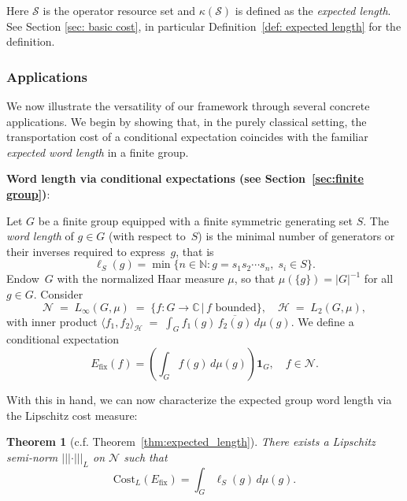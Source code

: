 \documentclass[11pt,reqno]{amsart}
\numberwithin{equation}{section}
\newtheorem{theorem}[lemma]{Theorem}
\newcommand{\mb}{\mathbb}
\newcommand{\mc}{\mathcal}
\newcommand{\Cost}{\mathrm{Cost}}
\newcommand{\fix}{\mathrm{fix}}
\begin{document}
Here $\mc S$ is the operator resource set and $\kappa(\mc S)$ is defined as the \textit{expected length}. See Section \ref{sec: basic cost}, in particular Definition~\ref{def: expected length} for the definition. 
\subsubsection{Applications}
We now illustrate the versatility of our framework through several concrete applications.  We begin by showing that, in the purely classical setting, the transportation cost of a conditional expectation coincides with the familiar \emph{expected word length} in a finite group.
\medskip 

\noindent \textbf{Word length via conditional expectations (see Section~\ref{sec:finite group})}: 

Let $G$ be a finite group equipped with a finite symmetric generating set $S$. The \emph{word length} of $g\in G$ (with respect to~$S$) is the minimal number of generators or their inverses required to express~$g$, that is
\begin{equation}
    \ell_{S}(g) = \min \{ n \in \mathbb{N} : g = s_1 s_2 \cdots s_n, \; s_i \in S \}.
\end{equation}
Endow~$G$ with the normalized Haar measure $\mu$, so that $\mu(\{g\})=|G|^{-1}$ for all $g\in G$. Consider
\[
  \mathcal N \;=\; L_{\infty}(G,\mu)
  \;=\;\bigl\{f:G\to\mb C \,\big|\, f\text{ bounded}\bigr\},
  \quad
  \mathcal H \;=\; L_{2}(G,\mu),
\]
with inner product $ \langle f_{1},f_{2}\rangle_{\mathcal H}
  \;=\;
  \int_G f_{1}(g)\,\overline{f_{2}(g)}\,d\mu(g)$. We define a conditional expectation
\begin{equation}
    E_{\fix}(f) = \left(\int_G f(g) \, d\mu(g)\right) \textbf{1}_G,\quad f\in \mc N.
\end{equation}

With this in hand, we can now characterize the expected group word length via the Lipschitz cost measure:
\begin{theorem}[c.f. Theorem~\ref{thm:expected_length}] \label{thm:word-length}
   There exists a Lipschitz semi-norm $|||\cdot|||_L$ on $\mc N$ such that 
    \[
        \Cost_{L}(E_{\fix})= \int_G \ell_{S}(g)\, d\mu(g).
    \]
\end{theorem}

\end{document}
